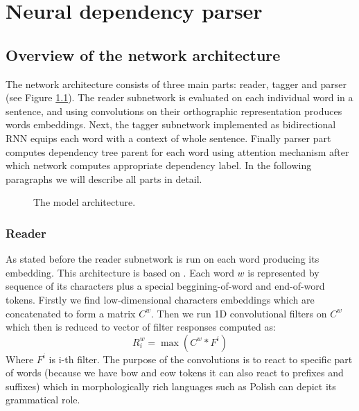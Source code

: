 \chapter{Neural dependency parser}

\section{Overview of the network architecture}
The network architecture consists of three main parts: reader, tagger and parser
(see Figure \ref{fig:architecture}). The reader subnetwork is evaluated on
each individual word in a sentence, and using convolutions on their orthographic
representation produces words embeddings. Next, the tagger subnetwork implemented
as bidirectional RNN equips each word with a context of whole sentence. Finally
parser part computes dependency tree parent for each word using attention mechanism
\cite{vinyals_pointer_2015} after which network computes appropriate dependency label.
In the following paragraphs we will describe all parts in detail.

\begin{figure}[t]
  \centering
  \caption{The model architecture.} 
  \label{fig:architecture}
\end{figure}

\subsection{Reader}
As stated before the reader subnetwork is run on each word producing its embedding.
This architecture is based on \cite{kim_character-aware_2015}. Each word $w$
is represented by sequence of its characters plus a special beggining-of-word and
end-of-word tokens. Firstly we find low-dimensional characters embeddings which
are concatenated to form a matrix $C^w$. Then we run 1D convolutional filters
on $C^w$ which then is reduced to vector of filter responses computed as:
\begin{equation} \label{eq:filter_responses}
    R^w_i = \max( C^w \ast F^i )
\end{equation}
Where $F^i$ is i-th filter. The purpose of the convolutions is to react to
specific part of words (because we have bow and eow tokens it can also react to
prefixes and suffixes) which in morphologically rich languages such as Polish   %
can depict its grammatical role.

